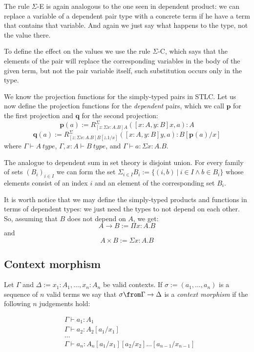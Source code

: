 The rule $\Sigma$-E is again analogous to the one seen in dependent product: we
can replace a variable of a dependent pair type with a concrete term if he
have a term that contains that variable. And again we just say what happens to
the type, not the value there.

To define the effect on the values we use the rule $\Sigma$-C, which says that
the elements of the pair will replace the corresponding variables in the body
of the given term, but not the pair variable itself, such substitution occurs
only in the type.

We know the projection functions for the simply-typed pairs in STLC. Let us now
define the projection functions for the \emph{dependent} pairs, which we call
$\mathbf{p}$ for the first projection and $\mathbf{q}$ for the second
projection:
\[
  \mathbf{p}(a) := R^\Sigma_{[z : \Sigma x: A. B]A}([x : A, y: B]x, a) : A
\]
\[
  \mathbf{q}(a) := R^\Sigma_{[z : \Sigma x: A. B]B[z.1/x]}([x : A, y: B]y, a) : B[\mathbf{p}(a)/x]
\]
where $\Gamma \vdash A~type$, $\Gamma, x:A \vdash B~type$, and $\Gamma \vdash a
: \Sigma x: A. B$.

The analogue to dependent sum in set theory is disjoint union. For every family
of sets $(B_i)_{i \in I}$ we can form the set $\Sigma_{i \in I} B_i := \{ (i,
b)~|~i \in I \land b \in B_i\}$ whose elements consist of an index $i$ and an
element of the corresponding set $B_i$.

It is worth notice that we may define the simply-typed products and functions
in terms of dependent types: we just need the types to not depend on each
other. So, assuming that $B$ does not depend on $A$, we get:
\[
  A \to B := \Pi x: A. B
\]
and
\[
  A \times B := \Sigma x: A. B
\]

\subsection*{Context morphism}

\begin{definition}
  Let $\Gamma$ and $\Delta := x_1: A_1, \dots, x_n : A_n$ be valid contexts. If
  $\sigma := (a_1, \dots, a_n)$ is a sequence of $n$ valid terms we say that
  $\sigma \from \Gamma \to \Delta$ is a \emph{context morphism} if the
  following $n$ judgements hold:

  \begin{align*}
    &\Gamma \vdash a_1 : A_1\\
    &\Gamma \vdash a_2 : A_2[a_1/x_1]\\
    &\dots\\
    &\Gamma \vdash a_n : A_n[a_1/x_1][a_2/x_2]\dots[a_{n-1}/x_{n-1}]
  \end{align*}
\end{definition}

